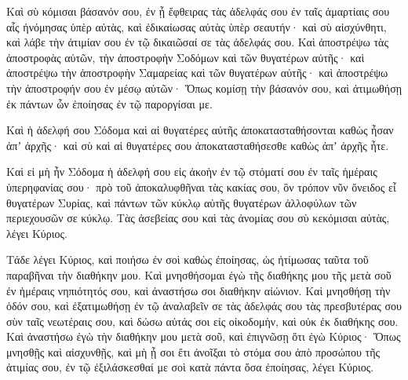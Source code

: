 {Καὶ σὺ κόμισαι βάσανόν σου, ἐν ᾗ ἔφθειρας τὰς ἀδελφάς σου ἐν ταῖς ἁμαρτίαις σου αἷς ἠνόμησας ὑπὲρ αὐτὰς, καὶ ἐδικαίωσας αὐτὰς ὑπὲρ σεαυτήν· καὶ σὺ αἰσχύνθητι, καὶ λάβε τὴν ἀτιμίαν σου ἐν τῷ δικαιῶσαί σε τὰς ἀδελφάς σου.
Καὶ ἀποστρέψω τὰς ἀποστροφὰς αὐτῶν, τὴν ἀποστροφὴν Σοδόμων καὶ τῶν θυγατέρων αὐτῆς· καὶ ἀποστρέψω τὴν ἀποστροφὴν Σαμαρείας καὶ τῶν θυγατέρων αὐτῆς· καὶ ἀποστρέψω τὴν ἀποστροφήν σου ἐν μέσῳ αὐτῶν·
Ὅπως κομίσῃ τὴν βάσανόν σου, καὶ ἀτιμωθήσῃ ἐκ πάντων ὧν ἐποίησας ἐν τῷ παροργίσαι με.
\par }{\PP {}Καὶ ἡ ἀδελφή σου Σόδομα καὶ αἱ θυγατέρες αὐτῆς ἀποκατασταθήσονται καθὼς ἦσαν ἀπʼ ἀρχῆς· καὶ σὺ καὶ αἱ θυγατέρες σου ἀποκατασταθήσεσθε καθὼς ἀπʼ ἀρχῆς ἦτε.
\par }{\PP {}Καὶ εἰ μὴ ἦν Σόδομα ἡ ἀδελφή σου εἰς ἀκοὴν ἐν τῷ στόματί σου ἐν ταῖς ἡμέραις ὑπερηφανίας σου·
πρὸ τοῦ ἀποκαλυφθῆναι τὰς κακίας σου, ὃν τρόπον νῦν ὄνειδος εἶ θυγατέρων Συρίας, καὶ πάντων τῶν κύκλῳ αὐτῆς θυγατέρων ἀλλοφύλων τῶν περιεχουσῶν σε κύκλῳ.
Τὰς ἀσεβείας σου καὶ τὰς ἀνομίας σου σὺ κεκόμισαι αὐτὰς, λέγει Κύριος.
\par }{\PP {}Τάδε λέγει Κύριος, καὶ ποιήσω ἐν σοὶ καθὼς ἐποίησας, ὡς ἠτίμωσας ταῦτα τοῦ παραβῆναι τὴν διαθήκην μου.
Καὶ μνησθήσομαι ἐγὼ τῆς διαθήκης μου τῆς μετὰ σοῦ ἐν ἡμέραις νηπιότητός σου, καὶ ἀναστήσω σοι διαθήκην αἰώνιον.
Καὶ μνησθήσῃ τὴν ὁδόν σου, καὶ ἐξατιμωθήσῃ ἐν τῷ ἀναλαβεῖν σε τὰς ἀδελφάς σου τὰς πρεσβυτέρας σου σὺν ταῖς νεωτέραις σου, καὶ δώσω αὐτάς σοι εἰς οἰκοδομὴν, καὶ οὐκ ἐκ διαθήκης σου.
Καὶ ἀναστήσω ἐγὼ τὴν διαθήκην μου μετὰ σοῦ, καὶ ἐπιγνῶσῃ ὅτι ἐγὼ Κύριος·
Ὅπως μνησθῇς καὶ αἰσχυνθῇς, καὶ μὴ ᾖ σοι ἔτι ἀνοῖξαι τὸ στόμα σου ἀπὸ προσώπου τῆς ἀτιμίας σου, ἐν τῷ ἐξιλάσκεσθαί με σοὶ κατὰ πάντα ὅσα ἐποίησας, λέγει Κύριος.

}
